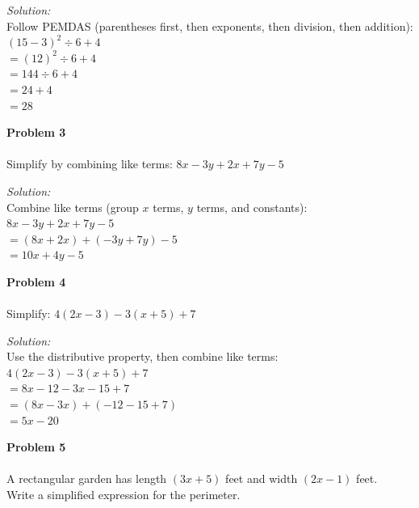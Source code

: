 \documentclass[12pt]{article}
\begin{document}
            \textit{Solution:}\\
            Follow PEMDAS (parentheses first, then exponents, then division, then addition):\\
            $(15 - 3)^2 \div 6 + 4$\\
            $= (12)^2 \div 6 + 4$\\
            $= 144 \div 6 + 4$\\
            $= 24 + 4$\\
            $= 28$


            \vspace{0.5cm}

            \textbf{Problem 3}\\\\
            Simplify by combining like terms: $8x - 3y + 2x + 7y - 5$

            \textit{Solution:}\\
            Combine like terms (group $x$ terms, $y$ terms, and constants):\\
            $8x - 3y + 2x + 7y - 5$\\
            $= (8x + 2x) + (-3y + 7y) - 5$\\
            $= 10x + 4y - 5$


            \newpage

            \textbf{Problem 4}\\\\
            Simplify: $4(2x - 3) - 3(x + 5) + 7$

            \textit{Solution:}\\
            Use the distributive property, then combine like terms:\\
            $4(2x - 3) - 3(x + 5) + 7$\\
            $= 8x - 12 - 3x - 15 + 7$\\
            $= (8x - 3x) + (-12 - 15 + 7)$\\
            $= 5x - 20$


            \vspace{0.5cm}

            \textbf{Problem 5}\\\\
            A rectangular garden has length $(3x + 5)$ feet and width $(2x - 1)$ feet.\\
            Write a simplified expression for the perimeter.
\end{document}
